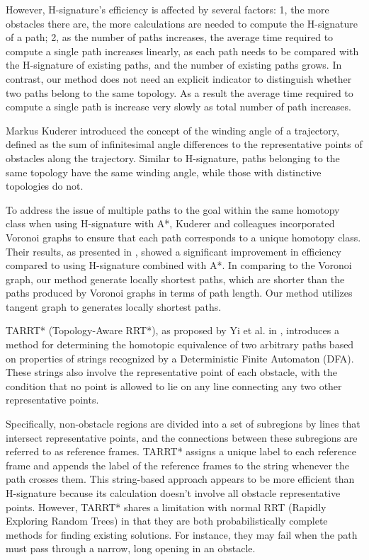\documentclass[lettersize,journal]{IEEEtran}
\begin{document}
However, H-signature's efficiency is affected by several factors: 1, the more obstacles there are, the more calculations are needed to compute the H-signature of a path; 2, as the number of paths increases, the average time required to compute a single path increases linearly, as each path needs to be compared with the H-signature of existing paths, and the number of existing paths grows. In contrast, our method does not need an explicit indicator to distinguish whether two paths belong to the same topology. As a result the average time required to compute a single path is increase very slowly as total number of path increases.

Markus Kuderer \cite{kuderer2014online} introduced the concept of the winding angle of a trajectory, defined as the sum of infinitesimal angle differences to the representative points of obstacles along the trajectory. Similar to H-signature, paths belonging to the same topology have the same winding angle, while those with distinctive topologies do not.

To address the issue of multiple paths to the goal within the same homotopy class when using H-signature with A*, Kuderer and colleagues incorporated Voronoi graphs to ensure that each path corresponds to a unique homotopy class. Their results, as presented in \cite{kuderer2014online}, showed a significant improvement in efficiency compared to using H-signature combined with A*. In comparing to the Voronoi graph, our method generate locally shortest paths, which are shorter than the paths produced by Voronoi graphs in terms of path length. Our method utilizes tangent graph\cite{liu1991proposal, oh2017edge} to generates locally shortest paths.    

TARRT* (Topology-Aware RRT*), as proposed by Yi et al. in \cite{yi2017topology}, introduces a method for determining the homotopic equivalence of two arbitrary paths based on properties of strings recognized by a Deterministic Finite Automaton (DFA). These strings also involve the representative point of each obstacle, with the condition that no point is allowed to lie on any line connecting any two other representative points. 

Specifically, non-obstacle regions are divided into a set of subregions by lines that intersect representative points, and the connections between these subregions are referred to as reference frames. TARRT* assigns a unique label to each reference frame and appends the label of the reference frames to the string whenever the path crosses them. This string-based approach appears to be more efficient than H-signature because its calculation doesn't involve all obstacle representative points. However, TARRT* shares a limitation with normal RRT (Rapidly Exploring Random Trees) in that they are both probabilistically complete methods for finding existing solutions. For instance, they may fail when the path must pass through a narrow, long opening in an obstacle.
\end{document}
